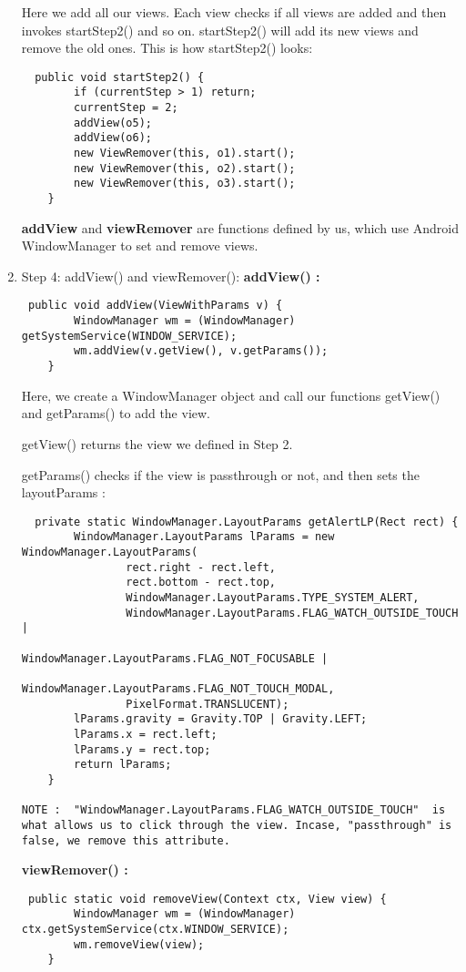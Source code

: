 \begin{enumerate}
Here we add all our views. Each view checks if all views are added and then
invokes startStep2() and so on. startStep2() will add its new views and
remove the old ones. This is how startStep2() looks: 

\begin{lstlisting}
  public void startStep2() {
        if (currentStep > 1) return;
        currentStep = 2;
        addView(o5);
        addView(o6);
        new ViewRemover(this, o1).start();
        new ViewRemover(this, o2).start();
        new ViewRemover(this, o3).start();
    }
\end{lstlisting}

\textbf{addView} and \textbf{viewRemover} are functions defined by us,
which use Android WindowManager to set and remove views.
   
\item Step 4: addView() and viewRemover(): 
\textbf{addView() :} 
\begin{lstlisting}
 public void addView(ViewWithParams v) {
        WindowManager wm = (WindowManager) getSystemService(WINDOW_SERVICE);
        wm.addView(v.getView(), v.getParams());
    }
\end{lstlisting}
Here, we create a WindowManager object and call our functions getView() and
getParams() to add the view. 

getView() returns the view we defined in Step 2.

getParams() checks if the view is passthrough or not, and then sets the layoutParams :

\begin{lstlisting}
  private static WindowManager.LayoutParams getAlertLP(Rect rect) {
        WindowManager.LayoutParams lParams = new WindowManager.LayoutParams(
                rect.right - rect.left,
                rect.bottom - rect.top,
                WindowManager.LayoutParams.TYPE_SYSTEM_ALERT,
                WindowManager.LayoutParams.FLAG_WATCH_OUTSIDE_TOUCH |
                        WindowManager.LayoutParams.FLAG_NOT_FOCUSABLE |
                        WindowManager.LayoutParams.FLAG_NOT_TOUCH_MODAL,
                PixelFormat.TRANSLUCENT);
        lParams.gravity = Gravity.TOP | Gravity.LEFT;
        lParams.x = rect.left;
        lParams.y = rect.top;
        return lParams;
    }

NOTE :  "WindowManager.LayoutParams.FLAG_WATCH_OUTSIDE_TOUCH"  is what allows us to click through the view. Incase, "passthrough" is false, we remove this attribute.
\end{lstlisting}

\textbf{viewRemover() :}
 \begin{lstlisting}
 public static void removeView(Context ctx, View view) {
        WindowManager wm = (WindowManager) ctx.getSystemService(ctx.WINDOW_SERVICE);
        wm.removeView(view);
    }
\end{lstlisting}
\end{enumerate}

